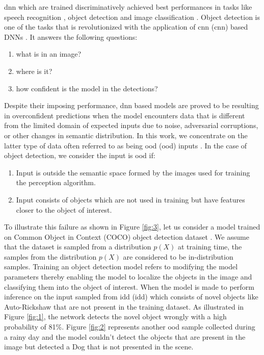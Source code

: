     \acrshort{dnn} which are trained discriminatively achieved best performances in tasks like speech recognition \citep{klosowski}, object detection \citep{DeepODReview} and image classification \citep{Voulodimos}. Object detection is one of the tasks that is revolutionized with the application of \acrlong{cnn} (\acrshort{cnn}) based DNNs \citep{DeepODReview}. It answers the following questions: 
    \begin{enumerate}
        \item what is in an image?
        \item where is it?
        \item how confident is the model in the detections?
    \end{enumerate}
    Despite their imposing performance, \acrshort{dnn} based models are proved to be resulting in overconfident predictions when the model encounters data that is different from the limited domain of expected inputs due to noise, adversarial corruptions, or other changes in semantic distribution. In this work, we concentrate on the latter type of data often referred to as being \acrlong{ood} (\acrshort{ood}) inputs \citep{goodfellow2014explaining, DNNFooled}. In the case of object detection, we consider the input is \acrshort{ood} if: 
    
    \begin{enumerate}
        \item Input is outside the semantic space formed by the images used for training the perception algorithm.
        \item Input consists of objects which are not used in training but have features closer to the object of interest.
    \end{enumerate}

    To illustrate this failure as shown in Figure \ref{fig:3}, let us consider a model trained on Common Object in Context (COCO) object detection dataset \citep{COCO_Dataset}. We assume that the dataset is sampled from a distribution $p(X)$ at training time, the samples from the distribution $p(X)$ are considered to be in-distribution samples. Training an object detection model refers to modifying the model parameters thereby enabling the model to localize the objects in the image and classifying them into the object of interest. When the model is made to perform inference on the input sampled from \acrlong{idd} (\acrshort{idd}) \citep{Varma2019IDDAD} which consists of novel objects like Auto-Rickshaw that are not present in the training dataset. As illustrated in Figure \ref{fig:1}, the network detects the novel object wrongly with a high probability of 81\%. Figure \ref{fig:2} represents another \acrshort{ood} sample collected during a rainy day and the model couldn't detect the objects that are present in the image but detected a Dog that is not presented in the scene. 
    
